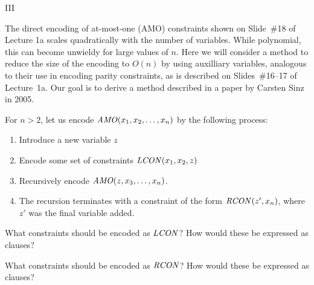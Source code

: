 \begin{problem}{III}

The direct encoding of at-most-one (AMO) constraints shown on
Slide~\#18 of Lecture 1a scales quadratically with the number of
variables.  While polynomial, this can become unwieldy for large
values of $n$.  Here we will consider a method to reduce the size of
the encoding to $O(n)$ by using auxilliary variables, analogous to their
use in encoding parity constraints, as is described on Slides~\#16--17
of Lecture~1a.  Our goal is to derive a method described in a paper by Carsten Sinz in 2005.

For $n > 2$, let us encode ${\it AMO}(x_1, x_2, \ldots, x_n)$ by the following process:
  \begin{enumerate}
  \item Introduce a new variable $z$
  \item Encode some set of constraints ${\it LCON}(x_1, x_2, z)$
  \item Recursively encode ${\it AMO}(z, x_3, \ldots, x_n)$.
  \item The recursion terminates with a constraint of the form
    ${\it  RCON}(z', x_n)$, where $z'$ was the final variable added.
  \end{enumerate}

\begin{choice}
\item
    What constraints should be encoded as ${\it LCON}$?  How would these be expressed as clauses?

\item
   What constraints should be encoded as ${\it RCON}$?  How would these be expressed as clauses?   


\end{choice}
\end{problem}

